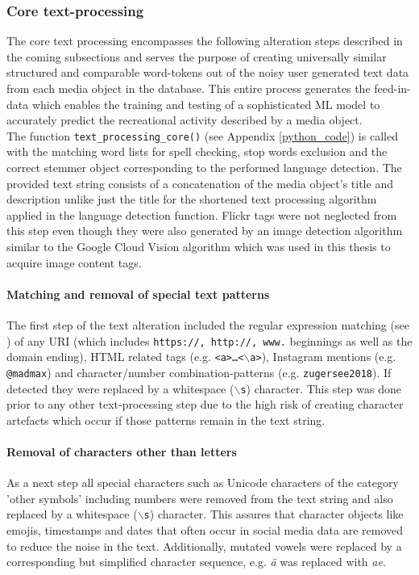 \subsubsection{Core text-processing} \label{core_text_processing}
The core text processing encompasses the following alteration steps described in the coming subsections and serves the purpose of creating universally similar structured and comparable word-tokens out of the noisy user generated text data from each media object in the database. This entire process generates the feed-in-data which enables the training and testing of a sophisticated ML model to accurately predict the recreational activity described by a media object.\\
The function \texttt{text\_processing\_core()} (see Appendix \ref{python_code}) is called with the matching word lists for spell checking, stop words exclusion and the correct stemmer object corresponding to the performed language detection. The provided text string consists of a concatenation of the media object's title and description unlike just the title for the shortened text processing algorithm applied in the language detection function. Flickr tags were not neglected from this step even though they were also generated by an image detection algorithm similar to the Google Cloud Vision algorithm which was used in this thesis to acquire image content tags.

\paragraph*{Matching and removal of special text patterns} \label{text_patterns}
The first step of the text alteration included the regular expression matching (see ) of any URI (which includes \texttt{https://, http://, www.} beginnings as well as the domain ending), HTML related tags (e.g. \texttt{<a>\dots<$\backslash$a>}), Instagram mentions (e.g. \texttt{@madmax}) and character/number combination-patterns (e.g. \texttt{zugersee2018}). If detected they were replaced by a whitespace (\texttt{$\backslash$s}) character. This step was done prior to any other text-processing step due to the high risk of creating character artefacts which occur if those patterns remain in the text string.

\paragraph*{Removal of characters other than letters} \label{remove_eveything_but_letters}
As a next step all special characters such as Unicode characters of the category 'other symbols' including numbers were removed from the text string and also replaced by a whitespace (\texttt{$\backslash$s}) character. This assures that character objects like emojis, timestamps and dates that often occur in social media data are removed to reduce the noise in the text. Additionally, mutated vowels were replaced by a corresponding but simplified character sequence, e.g. \textit{\"a} was replaced with \textit{ae}.

